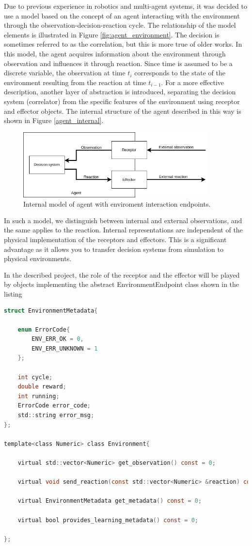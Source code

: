Due to previous experience in robotics and multi-agent systems, it was decided to use a model 
based on the concept of an agent interacting with the environment through the 
observation-decision-reaction cycle. 
The relationship of the model elements is illustrated in Figure \ref{fig:agent_environment}.
The decision is sometimes referred to as the correlation, but this is more true of older works.
In this model, the agent acquires  information about the environment through observation and 
influences it through reaction. 
Since time is assumed to be a discrete variable, the observation at time $t_{i}$ corresponds to the 
state of the environment resulting from the reaction at time $t_{i-1}$. 
For a more effective description, another layer of abstraction is introduced, separating the 
decision system (correlator) from the specific features of the environment using receptor and effector 
objects. 
The internal structure of the agent described in this way is shown in Figure \ref{agent_internal}.
\begin{figure}[htb] 
	\centering
	\includegraphics[width=0.9\textwidth]{figures/agent_receptor}
	\caption{Internal model of agent with enviroment interaction endpoints.}
	\label{fig:agent_internal}
\end{figure}

In such a model, we distinguish between internal and external observations, and the same applies 
to the reaction. Internal representations are independent of the physical implementation of the 
receptors and effectors. 
This is a significant advantage as it allows you to transfer decision systems from simulation to 
physical environments.

In the described project, the role of the receptor and the effector will be played by objects 
implementing the abstract EnvironmentEndpoint class shown in the listing

\begin{lstlisting}[language=C]
struct EnvironmentMetadata{

	enum ErrorCode{
		ENV_ERR_OK = 0, 
		ENV_ERR_UNKNOWN = 1 
	};

	int cycle;
	double reward;
	int running;
	ErrorCode error_code;
	std::string error_msg;
};

template<class Numeric> class Environment{

	virtual std::vector<Numeric> get_observation() const = 0;

	virtual void send_reaction(const std::vector<Numeric> &reaction) const = 0;

	virtual EnvironmentMetadata get_metadata() const = 0;

	virtual bool provides_learning_metadata() const = 0;

};
\end{lstlisting}

